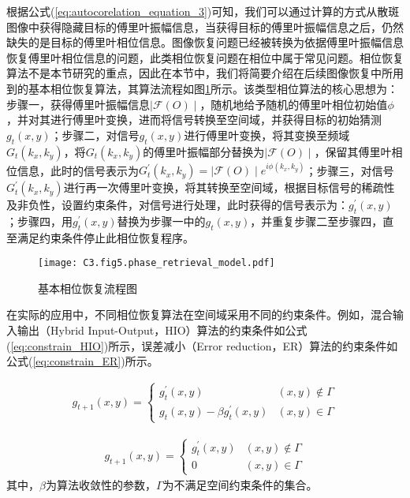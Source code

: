 根据公式(\ref{eq:autocorelation_equation_3})可知，我们可以通过计算的方式从散斑图像中获得隐藏目标的傅里叶振幅信息，当获得目标的傅里叶振幅信息之后，仍然缺失的是目标的傅里叶相位信息。图像恢复问题已经被转换为依据傅里叶振幅信息恢复傅里叶相位信息的问题，此类相位恢复问题在相位中属于常见问题。相位恢复算法不是本节研究的重点，因此在本节中，我们将简要介绍在后续图像恢复中所用到的基本相位恢复算法，其算法流程如图\ref{fig:3.5}所示。该类型相位算法的核心思想为：步骤一，获得傅里叶振幅信息$\mid \mathcal{F}(O) \mid$，随机地给予随机的傅里叶相位初始值$\phi$，并对其进行傅里叶变换，进而将信号转换至空间域，并获得目标的初始猜测$g_t(x,y)$；步骤二，对信号$g_t(x,y)$进行傅里叶变换，将其变换至频域$G_t(k_x,k_y)$，将$G_t(k_x,k_y)$的傅里叶振幅部分替换为$\mid \mathcal{F}(O) \mid$，保留其傅里叶相位信息，此时的信号表示为$G^{\prime}_t(k_x,k_y) =\mid \mathcal{F}(O) \mid e^{i\phi (k_x,k_y)}$；步骤三，对信号$G^{\prime}_t(k_x,k_y)$进行再一次傅里叶变换，将其转换至空间域，根据目标信号的稀疏性及非负性，设置约束条件，对信号进行处理，此时获得的信号表示为：$g^{\prime}_t(x,y)$；步骤四，用$g^{\prime}_t(x,y)$替换为步骤一中的$g_t(x,y)$，并重复步骤二至步骤四，直至满足约束条件停止此相位恢复程序。

\begin{figure}[htp]
	\centering
	\texttt{[image: C3.fig5.phase\_retrieval\_model.pdf]}
	\caption{基本相位恢复流程图}
	\label{fig:3.5}
\end{figure}
在实际的应用中，不同相位恢复算法在空间域采用不同的约束条件。例如，混合输入输出（Hybrid Input-Output，HIO）算法的约束条件如公式(\ref{eq:constrain_HIO})所示，误差减小（Error reduction，ER）算法的约束条件如公式(\ref{eq:constrain_ER})所示。


\begin{equation}
\begin{aligned}
 g_{t+1}(x,y) =
		  \begin{cases}
		    g_{t}^{\prime}(x,y)   &   (x,y)\notin\Gamma\\
		    g_{t}(x,y)-\beta g_{t}^{\prime}(x,y) & (x,y)\in\Gamma
		  \end{cases}
\end{aligned}
\label{eq:constrain_HIO}
\end{equation}

\begin{equation}
\begin{aligned}
 g_{t+1}(x,y) =
		  \begin{cases}
		    g_{t}^{\prime}(x,y)   &   (x,y)\notin\Gamma\\
		    0  & (x,y)\in\Gamma
		  \end{cases}
\end{aligned}
\label{eq:constrain_ER}
\end{equation}
其中，$\beta$为算法收敛性的参数，$\Gamma$为不满足空间约束条件的集合。

